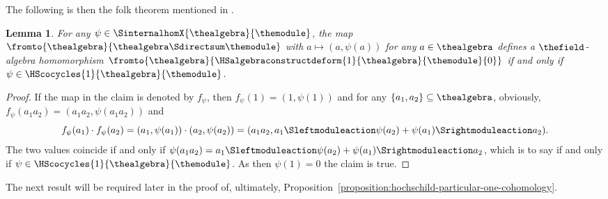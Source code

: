 \documentclass[pdftex]{sigma}
\numberwithin{equation}{section}
\newtheorem{Lemma}[Theorem]{Lemma}
\begin{document}
{  The following is then  the folk theorem mentioned in \cite[Lem\-ma~1.9]{KyedRaum2017}.

  {
      \newcommand{\thedeform}{c}
  \newcommand{\thedeformxx}[2]{c(#1 \Smonoidalproduct #2)}
  \newcommand{\anyelement}{a}
  \newcommand{\firstelement}{a_1}
      \newcommand{\secondelement}{a_2}
      \newcommand{\thirdelement}{a_3}
    \newcommand{\somefunc}{\psi}
      \begin{Lemma}
    \label{lemma:the-bfg-lemma}
    \newcommand{\somea}{a}
For any $\somefunc\in\SinternalhomX{\thealgebra}{\themodule}$, the map $\fromto{\thealgebra}{\thealgebra\Sdirectsum\themodule}$ with $\somea\mapsto (\somea,\somefunc(\somea))$ for any $\somea\in \thealgebra$ defines a $\thefield$-algebra homomorphism  $\fromto{\thealgebra}{\HSalgebraconstructdeform{1}{\thealgebra}{\themodule}{0}}$ if and only if $\somefunc\in \HScocycles{1}{\thealgebra}{\themodule}$.
    \end{Lemma}
    \begin{proof}
    \newcommand{\somea}[1]{a_{#1}}
    \newcommand{\firsta}{a_{1}}
    \newcommand{\seconda}{a_{2}}
    \newcommand{\themap}{f_\somefunc}
    If the map in the claim is denoted by $\themap$, then  $\themap(1)=(1,\somefunc(1))$ and for any $\{\firsta,\seconda\}\subseteq \thealgebra$, obviously, $\themap(\firsta\seconda)=(\firsta\seconda,\somefunc(\firsta\seconda))$ and
    \[
      \themap(\firsta)\cdot\themap(\seconda)=(\firsta,\somefunc(\firsta))\cdot(\seconda,\somefunc(\seconda))=(\firsta\seconda,\firsta\Sleftmoduleaction\somefunc(\seconda)+\somefunc(\firsta)\Srightmoduleaction\seconda).
    \]
    The two values coincide if and only if $\somefunc(\firsta\seconda)=\firsta\Sleftmoduleaction\somefunc(\seconda)+\somefunc(\firsta)\Srightmoduleaction\seconda$, which is to say if and only if $\somefunc\in \HScocycles{1}{\thealgebra}{\themodule}$. As then $\somefunc(1)=0$ the claim is true.
    \end{proof}
  }

The next result will be required later in the proof of, ultimately, Pro\-po\-si\-tion~\ref{proposition:hochschild-particular-one-cohomology}.

}
\end{document}

